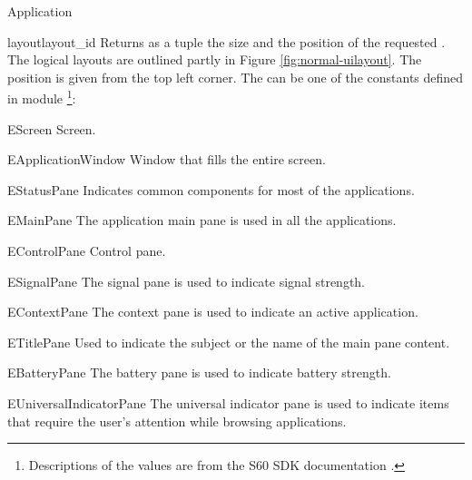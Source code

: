 \begin{classdesc*}{Application}
\begin{methoddesc}[Application]{layout}{layout_id}
Returns as a tuple the size and the position of the requested . 
The logical layouts are outlined partly in Figure \ref{fig:normal-uilayout}. The 
position is given from the top left corner. The  can be one of 
the constants defined in module \footnote{Descriptions of the 
values are from the S60 SDK documentation \cite{S60Doc}.}:

\begin{datadesc}{EScreen} 
Screen.  
\end{datadesc}

\begin{datadesc}{EApplicationWindow} 
 Window that fills the entire screen.
\end{datadesc}

\begin{datadesc}{EStatusPane} 
Indicates common components for most of the applications.  
\end{datadesc}

\begin{datadesc}{EMainPane} 
The application main pane is used in all the applications.  
\end{datadesc}

\begin{datadesc}{EControlPane} 
Control pane.
\end{datadesc}

\begin{datadesc}{ESignalPane} 
The signal pane is used to indicate signal strength.  
\end{datadesc}

\begin{datadesc}{EContextPane} 
The context pane is used to indicate an active application.
\end{datadesc}

\begin{datadesc}{ETitlePane} 
Used to indicate the subject or the name of the main pane content. 
\end{datadesc}

\begin{datadesc}{EBatteryPane} 
The battery pane is used to indicate battery strength.  
\end{datadesc}

\begin{datadesc}{EUniversalIndicatorPane} 
The universal indicator pane is used to indicate items that require the user's 
attention while browsing applications. 
\end{datadesc}


\end{methoddesc}
\end{classdesc*}

